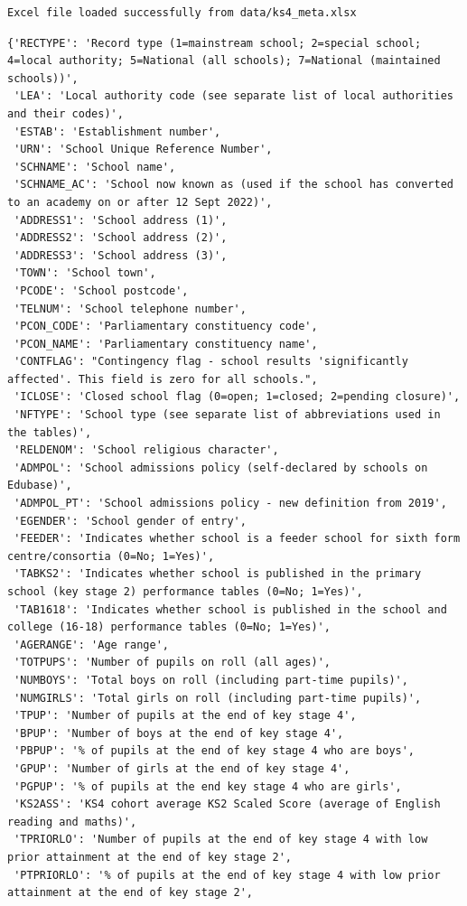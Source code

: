 \documentclass[
  letterpaper,
  DIV=11,
  numbers=noendperiod]{scrartcl}
\begin{document}
\begin{verbatim}
Excel file loaded successfully from data/ks4_meta.xlsx
\end{verbatim}

\begin{verbatim}
{'RECTYPE': 'Record type (1=mainstream school; 2=special school; 4=local authority; 5=National (all schools); 7=National (maintained schools))',
 'LEA': 'Local authority code (see separate list of local authorities and their codes)',
 'ESTAB': 'Establishment number',
 'URN': 'School Unique Reference Number',
 'SCHNAME': 'School name',
 'SCHNAME_AC': 'School now known as (used if the school has converted to an academy on or after 12 Sept 2022)',
 'ADDRESS1': 'School address (1)',
 'ADDRESS2': 'School address (2)',
 'ADDRESS3': 'School address (3)',
 'TOWN': 'School town',
 'PCODE': 'School postcode',
 'TELNUM': 'School telephone number',
 'PCON_CODE': 'Parliamentary constituency code',
 'PCON_NAME': 'Parliamentary constituency name',
 'CONTFLAG': "Contingency flag - school results 'significantly affected'. This field is zero for all schools.",
 'ICLOSE': 'Closed school flag (0=open; 1=closed; 2=pending closure)',
 'NFTYPE': 'School type (see separate list of abbreviations used in the tables)',
 'RELDENOM': 'School religious character',
 'ADMPOL': 'School admissions policy (self-declared by schools on Edubase)',
 'ADMPOL_PT': 'School admissions policy - new definition from 2019',
 'EGENDER': 'School gender of entry',
 'FEEDER': 'Indicates whether school is a feeder school for sixth form centre/consortia (0=No; 1=Yes)',
 'TABKS2': 'Indicates whether school is published in the primary school (key stage 2) performance tables (0=No; 1=Yes)',
 'TAB1618': 'Indicates whether school is published in the school and college (16-18) performance tables (0=No; 1=Yes)',
 'AGERANGE': 'Age range',
 'TOTPUPS': 'Number of pupils on roll (all ages)',
 'NUMBOYS': 'Total boys on roll (including part-time pupils)',
 'NUMGIRLS': 'Total girls on roll (including part-time pupils)',
 'TPUP': 'Number of pupils at the end of key stage 4',
 'BPUP': 'Number of boys at the end of key stage 4',
 'PBPUP': '% of pupils at the end of key stage 4 who are boys',
 'GPUP': 'Number of girls at the end of key stage 4',
 'PGPUP': '% of pupils at the end key stage 4 who are girls',
 'KS2ASS': 'KS4 cohort average KS2 Scaled Score (average of English reading and maths)',
 'TPRIORLO': 'Number of pupils at the end of key stage 4 with low prior attainment at the end of key stage 2',
 'PTPRIORLO': '% of pupils at the end of key stage 4 with low prior attainment at the end of key stage 2',

\end{verbatim}
\end{document}
